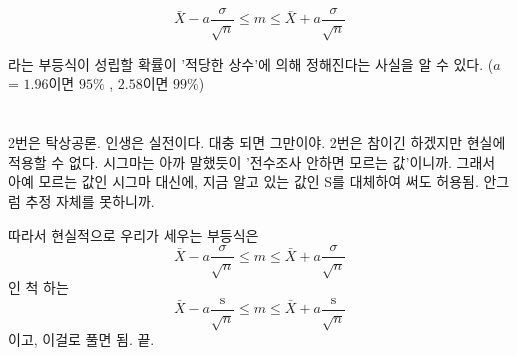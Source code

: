 \documentclass{oblivoir}
\begin{document}
$$\bar{X} - a\dfrac{\sigma}{\sqrt{n}}\le m \le \bar{X} + a\dfrac{\sigma}{\sqrt{n}}$$

라는 부등식이 성립할 확률이 '적당한 상수'에 의해 정해진다는 사실을 알 수 있다. 
($a$ = $1.96$이면 $95\%$ , $2.58$이면 $99\%$)

\section{}
2번은 탁상공론. 인생은 실전이다. 
대충 되면 그만이야.
2번은 참이긴 하겠지만 현실에 적용할 수 없다. 시그마는 아까 말했듯이 '전수조사 안하면 모르는 값'이니까.
그래서 아예 모르는 값인 시그마 대신에, 지금 알고 있는 값인 S를 대체하여 써도 허용됨. 안그럼 추정 자체를 못하니까.


따라서 현실적으로 우리가 세우는 부등식은
$$\bar{X} - a\dfrac{\sigma}{\sqrt{n}}\le m \le \bar{X} + a\dfrac{\sigma}{\sqrt{n}}$$
인 척 하는
$$\bar{X} - a\dfrac{\mathrm{s}}{\sqrt{n}}\le m \le \bar{X} + a\dfrac{\mathrm{s}}{\sqrt{n}}$$
이고, 이걸로 풀면 됨. 끝.
\end{document}
